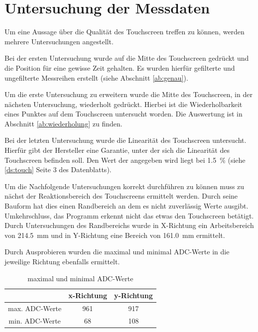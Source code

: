 \chapter{Untersuchung der Messdaten}
Um eine Aussage über die Qualität des Touchscreen treffen zu können, werden mehrere Untersuchungen angestellt. 

Bei der ersten Untersuchung wurde auf die Mitte des Touchscreen gedrückt und die Position für eine gewisse Zeit gehalten.
Es wurden hierfür gefilterte und ungefilterte Messreihen erstellt (siehe Abschnitt \ref{ab:genau}).

Um die erste Untersuchung zu erweitern wurde die Mitte des Touchscreen, in der nächsten Untersuchung, wiederholt gedrückt. Hierbei ist die Wiederholbarkeit eines Punktes auf dem Touchscreen untersucht worden. 
Die Auswertung ist in Abschnitt \ref{ab:wiederholung} zu finden.

Bei der letzten Untersuchung wurde die Linearität des Touchscreen untersucht. Hierfür gibt der Hersteller eine Garantie, unter der sich die Linearität des Touchscreen befinden soll. 
Den Wert der angegeben wird liegt bei \SI{1,5}{\%} (siehe \ref{ds:touch} Seite 3 des Datenblatts). 

Um die Nachfolgende Untersuchungen korrekt durchführen zu können muss zu nächst der Reaktionsbereich des Touchscreens ermittelt werden.
Durch seine Bauform hat dies einen Randbereich an dem es nicht zuverlässig Werte ausgibt. Umkehrschluss, das Programm erkennt nicht das etwas den Touchscreen betätigt. 
Durch Untersuchungen des Randbereichs wurde in X-Richtung ein Arbeitsbereich von \SI{214,5}{mm} und in Y-Richtung eine Bereich von \SI{161,0}{mm} ermittelt.

Durch Ausprobieren wurden die maximal und minimal ADC-Werte in die jeweilige Richtung ebenfalls ermittelt. 
\begin{table}[ht!]
    \caption{maximal und minimal ADC-Werte}
    \begin{center}
        \begin{tabular}{ c |c| c }
                & x-Richtung & y-Richtung \\ \hline
         max. ADC-Werte & 961 & 917 \\  \hline
         min. ADC-Werte& 68 & 108 \\   
        \end{tabular}
    \end{center}   
\end{table}

